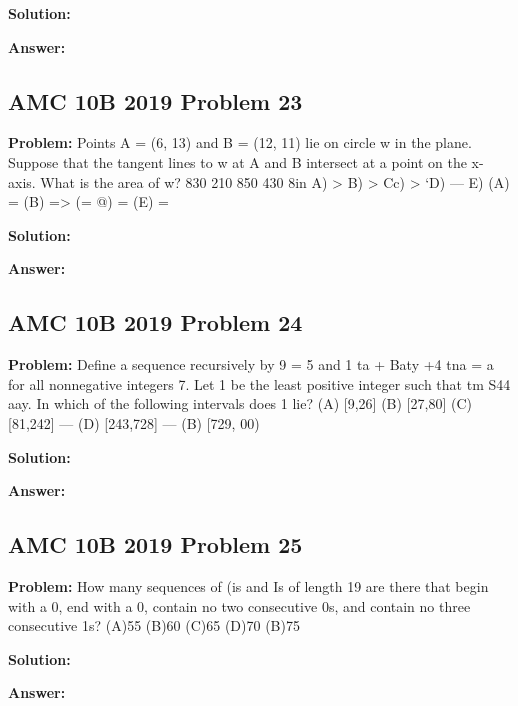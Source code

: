 \documentclass{article}
\newenvironment{problem}{\textbf{Problem: }}{\\}
\newenvironment{solution}{\textbf{Solution: }}{\\}
\newenvironment{answer}{\textbf{Answer: }}{\\}
\begin{document}
\begin{solution}
\end{solution}

\begin{answer}
\end{answer}

\subsection{AMC 10B 2019 Problem 23}

\begin{problem}
Points A = (6, 13) and B = (12, 11) lie on circle w in the plane. Suppose that the tangent lines to w at A and B intersect at a point on the x- axis. What is the area of w? 830 210 850 430 8in A) > B) > Cc) > ‘D) — E) (A) = (B) => (= @) = (E) =
\end{problem}

\begin{solution}
\end{solution}

\begin{answer}
\end{answer}

\subsection{AMC 10B 2019 Problem 24}

\begin{problem}
Define a sequence recursively by 9 = 5 and 1 ta + Baty +4 tna = a for all nonnegative integers 7. Let 1 be the least positive integer such that tm S44 aay. In which of the following intervals does 1 lie? (A) [9,26] (B) [27,80] (C) [81,242] — (D) [243,728] — (B) [729, 00)
\end{problem}

\begin{solution}
\end{solution}

\begin{answer}
\end{answer}

\subsection{AMC 10B 2019 Problem 25}

\begin{problem}
How many sequences of (is and Is of length 19 are there that begin with a 0, end with a 0, contain no two consecutive 0s, and contain no three consecutive 1s? (A)55 (B)60 (C)65 (D)70 (B)75
\end{problem}

\begin{solution}
\end{solution}

\begin{answer}
\end{answer}
\end{document}
